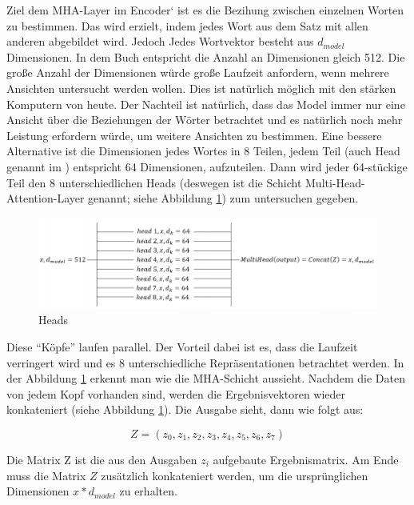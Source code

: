 Ziel dem MHA-Layer im Encoder` ist es die Bezihung zwischen einzelnen Worten zu bestimmen. Das wird erzielt, indem jedes Wort aus dem Satz mit allen anderen abgebildet wird. Jedoch  Jedes Wortvektor besteht aus $d_{model}$ Dimensionen. In dem Buch \cite{denis_Transformer:02} entspricht die Anzahl an Dimensionen gleich 512. Die große Anzahl der Dimensionen würde große Laufzeit anfordern, wenn mehrere Ansichten untersucht werden wollen. Dies ist natürlich möglich mit den stärken Komputern von heute. Der Nachteil ist natürlich, dass das Model immer nur eine Ansicht über die Beziehungen der Wörter betrachtet und es natürlich noch mehr Leistung erfordern würde, um weitere Ansichten zu bestimmen. Eine bessere Alternative ist die Dimensionen jedes Wortes in 8 Teilen, jedem Teil (auch Head genannt im \cite{denis_Transformer:02}) entspricht 64 Dimensionen, aufzuteilen. Dann wird jeder 64-stückige Teil den 8 unterschiedlichen Heads (deswegen ist die Schicht Multi-Head-Attention-Layer genannt; siehe Abbildung \ref{multi_head}) zum untersuchen gegeben. 

\begin{figure}
	\centering
	\includegraphics[scale=0.4]{images/multi_head.png}
	\caption{Heads \cite{denis_Transformer:02}}
	\label{multi_head}
\end{figure}

Diese ``Köpfe'' laufen parallel. Der Vorteil dabei ist es, dass die Laufzeit verringert wird und es 8 unterschiedliche Repräsentationen betrachtet werden. In der Abbildung \ref{multi_head} erkennt man wie die MHA-Schicht aussieht. Nachdem die Daten von jedem Kopf vorhanden sind, werden die Ergebnisvektoren wieder konkateniert (siehe Abbildung \ref{multi_head}). Die Ausgabe sieht, dann wie folgt aus:

\begin{equation}
	Z = (z_0, z_1, z_2, z_3, z_4, z_5, z_6, z_7)
\end{equation}

Die Matrix Z ist die aus den Ausgaben $z_i$ aufgebaute Ergebnismatrix. Am Ende muss die Matrix $Z$ zusätzlich konkateniert werden, um die ursprünglichen Dimensionen $x*d_{model}$ zu erhalten.

